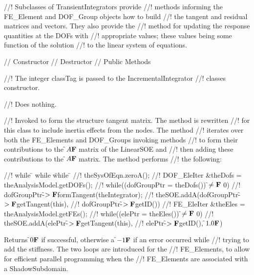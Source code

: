 //! Subclasses of TransientIntegrators provide
//! methods informing the FE\_Element and DOF\_Group objects how to build
//! the tangent and residual matrices and vectors. They also provide the
//! method for updating the response quantities at the DOFs with
//! appropriate values; these values being some function of the solution
//! to the linear system of equations. 


\indent // Constructor
\indent // Destructor 
\indent // Public Methods

//! The integer \p classTag is passed to the IncrementalIntegrator
//! classes constructor.

//! Does nothing.

//! Invoked to form the structure tangent matrix. The method is rewritten
//! for this class to include inertia effects from the nodes. The method
//! iterates over both the FE\_Elements and DOF\_Groups invoking methods
//! to form their contributions to the \f$A{\bf F}$ matrix of the LinearSOE and
//! then adding these contributions to the \f$A{\bf F}$ matrix. The method performs
//! the following:
\begin{tabbing}
//! while \= \+ while \= while \= \kill
//! theSysOfEqn.zeroA();
//! DOF\_EleIter \&theDofs = theAnalysisModel.getDOFs();
//! while((dofGroupPtr = theDofs()) \f$\neq{\bf F}$ 0) \+
//! dofGroupPtr-\f$>{\bf F}$formTangent(theIntegrator);
//! theSOE.addA(dofGroupPtr-\f$>{\bf F}$getTangent(this),
//! dofGroupPtr-\f$>{\bf F}$getID()) \-
//! FE\_EleIter \&theEles = theAnalysisModel.getFEs();
//! while((elePtr = theEles()) \f$\neq{\bf F}$ 0) \+
//! theSOE.addA(elePtr-\f$>{\bf F}$getTangent(this),
//! elePtr-\f$>{\bf F}$getID(), \f$1.0{\bf F}$)
\end{tabbing}
\noindent Returns \f$0{\bf F}$ if successful, otherwise a \f$-1{\bf F}$ if an error occurred while
//! trying to add the stiffness. The two loops are introduced for the
//! FE\_Elements, to allow for efficient parallel programming when the
//! FE\_Elements are associated with a ShadowSubdomain. 

